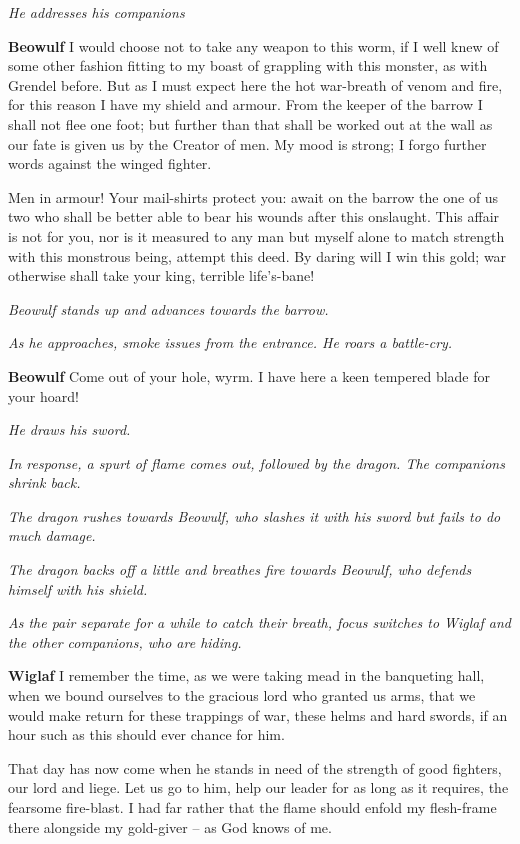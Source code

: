 \documentclass[a4paper]{article}
\begin{document}
{\centerline{\textit{He addresses his companions}}

\textbf{Beowulf} I would choose not to take
any weapon to this worm, if I well knew
of some other fashion fitting to my boast
of grappling with this monster, as with Grendel before.
But as I must expect here the hot war-breath
of venom and fire, for this reason I have
my shield and armour. From the keeper of the barrow
I shall not flee one foot; but further than that
shall be worked out at the wall as our fate is given us
by the Creator of men. My mood is strong;
I forgo further words against the winged fighter.

Men in armour! Your mail-shirts protect you:
await on the barrow the one of us two
who shall be better able to bear his wounds
after this onslaught. This affair is not for you,
nor is it measured to any man but myself alone
to match strength with this monstrous being,
attempt this deed. By daring will I
win this gold; war otherwise
shall take your king, terrible life’s-bane!

\centerline{\textit{Beowulf stands up and advances towards the barrow.}}
\centerline{\textit{As he approaches, smoke issues from the entrance. He roars a battle-cry.}}

\textbf{Beowulf} Come out of your hole, wyrm.
I have here a keen tempered blade for your hoard!

\centerline{\textit{He draws his sword.}}
\centerline{\textit{In response, a spurt of flame comes out, followed by the dragon. The companions shrink back.}}

\centerline{\textit{The dragon rushes towards Beowulf, who slashes it with his sword but fails to do much damage.}}
\centerline{\textit{The dragon backs off a little and breathes fire towards Beowulf, who defends himself with his shield.}}
\centerline{\textit{As the pair separate for a while to catch their breath, focus switches to Wiglaf and the other companions, who are hiding.}}

\textbf{Wiglaf} I remember the time, as we were taking mead
in the banqueting hall, when we bound ourselves
to the gracious lord who granted us arms,
that we would make return for these trappings of war,
these helms and hard swords, if an hour such as this
should ever chance for him. 

That day has now come
when he stands in need of the strength of good fighters,
our lord and liege. Let us go to him,
help our leader for as long as it requires,
the fearsome fire-blast. I had far rather
that the flame should enfold my flesh-frame there
alongside my gold-giver – as God knows of me.

}
\end{document}
